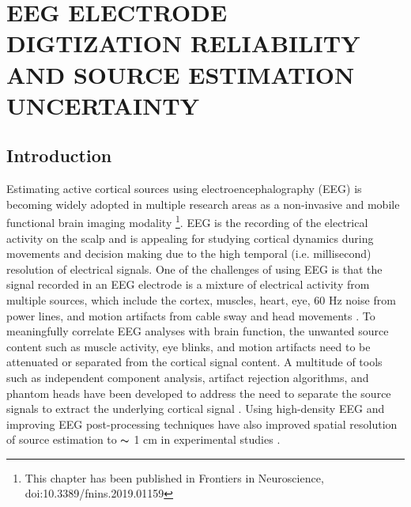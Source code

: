 \documentclass[../thesis_seyed.tex]{subfiles}
\begin{document}
\chapter{EEG ELECTRODE DIGTIZATION RELIABILITY AND SOURCE ESTIMATION UNCERTAINTY}
\section{Introduction}

Estimating active cortical sources using electroencephalography (EEG) is becoming widely adopted in multiple research areas as a non-invasive and mobile functional brain imaging modality  \cite{Tsolaki2017-nt,Bradley2016-wg,Landsness2011-mr,Nystrom2008-ex} \footnote{This chapter has been published in Frontiers in Neuroscience, doi:10.3389/fnins.2019.01159}. EEG is the recording of the electrical activity on the scalp and is appealing for studying cortical dynamics during movements and decision making due to the high temporal (i.e. millisecond) resolution of electrical signals. One of the challenges of using EEG is that the signal recorded in an EEG electrode is a mixture of electrical activity from multiple sources, which include the cortex, muscles, heart, eye, 60 Hz noise from power lines, and motion artifacts from cable sway and head movements \cite{Kline2015-mf,Symeonidou2018-ge}. To meaningfully correlate EEG analyses with brain function, the unwanted source content such as muscle activity, eye blinks, and motion artifacts need to be attenuated or separated from the cortical signal content. A multitude of tools such as independent component analysis, artifact rejection algorithms, and phantom heads have been developed to address the need to separate the source signals to extract the underlying cortical signal \cite{Delorme2012-re,Mullen2013-xv,Artoni2014-jy,Oliveira2016-hy,Nordin2018-aq}. Using high-density EEG and improving EEG post-processing techniques have also improved spatial resolution of source estimation to $\thicksim$ 1 cm in experimental studies \cite{Seeber2019-dn,Hedrich2017-of,Klamer2015-yp,Scarff2004-ll,Lantz2003-om,He1989-dw}.
\end{document}
